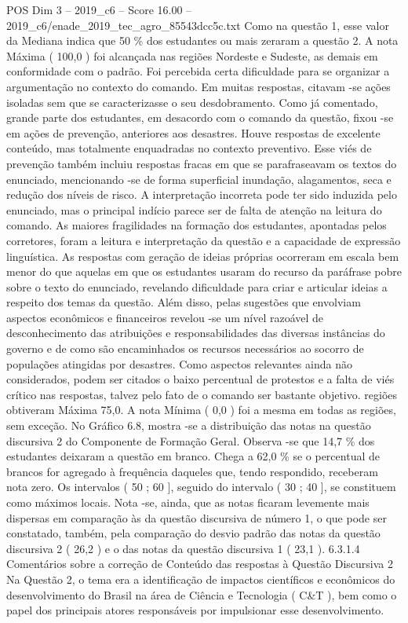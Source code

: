 \begin{textsample}{POS Dim 3 – 2019\_c6 – Score 16.00 – 2019\_c6/enade\_2019\_tec\_agro\_85543dcc5c.txt}
Como na questão 1, esse valor da Mediana indica que 50 \% dos estudantes ou mais zeraram a questão 2.
A nota Máxima ( 100,0 ) foi alcançada nas regiões Nordeste e Sudeste, as demais em conformidade com o padrão.
Foi percebida certa dificuldade para se organizar a argumentação no contexto do comando.
Em muitas respostas, citavam -se ações isoladas sem que se caracterizasse o seu desdobramento.
Como já comentado, grande parte dos estudantes, em desacordo com o comando da questão, fixou -se em ações de prevenção, anteriores aos desastres.
Houve respostas de excelente conteúdo, mas totalmente enquadradas no contexto preventivo.
Esse viés de prevenção também incluiu respostas fracas em que se parafraseavam os textos do enunciado, mencionando -se de forma superficial inundação, alagamentos, seca e redução dos níveis de risco.
A interpretação incorreta pode ter sido induzida pelo enunciado, mas o principal indício parece ser de falta de atenção na leitura do comando.
As maiores fragilidades na formação dos estudantes, apontadas pelos corretores, foram a leitura e interpretação da questão e a capacidade de expressão linguística.
As respostas com geração de ideias próprias ocorreram em escala bem menor do que aquelas em que os estudantes usaram do recurso da paráfrase pobre sobre o texto do enunciado, revelando dificuldade para criar e articular ideias a respeito dos temas da questão.
Além disso, pelas sugestões que envolviam aspectos econômicos e financeiros revelou -se um nível razoável de desconhecimento das atribuições e responsabilidades das diversas instâncias do governo e de como são encaminhados os recursos necessários ao socorro de populações atingidas por desastres.
Como aspectos relevantes ainda não considerados, podem ser citados o baixo percentual de protestos e a falta de viés crítico nas respostas, talvez pelo fato de o comando ser bastante objetivo. regiões obtiveram Máxima 75,0.
A nota Mínima ( 0,0 ) foi a mesma em todas as regiões, sem exceção.
No Gráfico 6.8, mostra -se a distribuição das notas na questão discursiva 2 do Componente de Formação Geral.
Observa -se que 14,7 \% dos estudantes deixaram a questão em branco.
Chega a 62,0 \% se o percentual de brancos for agregado à frequência daqueles que, tendo respondido, receberam nota zero.
Os intervalos ( 50 ; 60 ], seguido do intervalo ( 30 ; 40 ], se constituem como máximos locais.
Nota -se, ainda, que as notas ficaram levemente mais dispersas em comparação às da questão discursiva de número 1, o que pode ser constatado, também, pela comparação do desvio padrão das notas da questão discursiva 2 ( 26,2 ) e o das notas da questão discursiva 1 ( 23,1 ). 6.3.1.4 Comentários sobre a correção de Conteúdo das respostas à Questão Discursiva 2 Na Questão 2, o tema era a identificação de impactos científicos e econômicos do desenvolvimento do Brasil na área de Ciência e Tecnologia ( C\&T ), bem como o papel dos principais atores responsáveis por impulsionar esse desenvolvimento.

\end{textsample}

